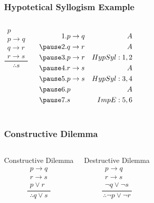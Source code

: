 \documentclass[dvipsnames]{beamer}
\begin{document}
\begin{frame}
  \frametitle{Hypotetical Syllogism Example}

  \begin{columns}
    \[
    \frac
      {
        \begin{array}{c}
          p\\
          p \rightarrow q\\
          q \rightarrow r\\
          r \rightarrow s
        \end{array}
      }
      {
        \therefore s
      }
    \]

    \pause
    \begin{eqnarray*}
      1. & p \rightarrow q & A\\
      \pause
      2. & q \rightarrow r & A\\
      \pause
      3. & p \rightarrow r & HypSyl:1,2\\
      \pause
      4. & r \rightarrow s & A\\
      \pause
      5. & p \rightarrow s & HypSyl:3,4\\
      \pause
      6. & p               & A\\
      \pause
      7. & s               & ImpE:5,6
    \end{eqnarray*}
  \end{columns}
\end{frame}

\begin{frame}
  \frametitle{Constructive Dilemma}

  \begin{columns}[t]
    \begin{block}{Constructive Dilemma}
      \[
      \frac
        {
          \begin{array}{c}
            p \rightarrow q\\
            r \rightarrow s\\
            p \vee r
          \end{array}}
        {
          \therefore q \vee s
        }
      \]
    \end{block}

    \pause
    \begin{block}{Destructive Dilemma}
      \[
      \frac
        {
          \begin{array}{c}
            p \rightarrow q\\
            r \rightarrow s\\
            \neg q \vee \neg s
          \end{array}
          }
          {
            \therefore \neg p \vee \neg r
          }
      \]
    \end{block}
  \end{columns}
\end{frame}
\end{document}

